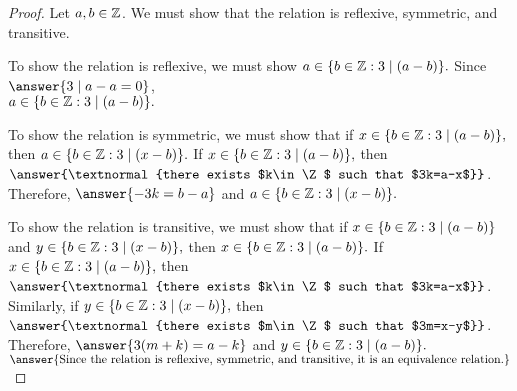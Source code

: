 \documentclass{ximera}
\begin{document}
  \begin{proof}
    Let $a,b\in\mathbb Z$. We must show that the relation is reflexive, symmetric, and transitive.
  
     To show the relation is reflexive, we must show $a\in \{b\in\mathbb Z: 3\mid(a-b)\}.$ Since $\answer{3\mid a-a=0}$,\\
     $a\in \{b\in\mathbb Z: 3\mid(a-b)\}.$
  
     To show the relation is symmetric, we must show that if $x\in \{b\in\mathbb Z: 3\mid(a-b)\},$ then $a\in \{b\in\mathbb Z: 3\mid(x-b)\}.$ If $x\in \{b\in\mathbb Z: 3\mid(a-b)\},$ then $\answer{\textnormal{there exists $k\in\Z$ such that $3k=a-x$}}$. Therefore, $\answer{-3k=b-a}$
     and $a\in \{b\in\mathbb Z: 3\mid(x-b)\}.$
  
     To show the relation is transitive, we must show that if $x\in \{b\in\mathbb Z: 3\mid(a-b)\}$ and $y\in \{b\in\mathbb Z: 3\mid(x-b)\},$ then $x\in \{b\in\mathbb Z: 3\mid(a-b)\}.$ If $x\in \{b\in\mathbb Z: 3\mid(a-b)\},$ then $\answer{\textnormal{there exists $k\in\Z$ such that $3k=a-x$}}$. 
     Similarly, if $y\in \{b\in\mathbb Z: 3\mid(x-b)\},$ then $\answer{\textnormal{there exists $m\in\Z$ such that $3m=x-y$}}$.
     Therefore, $\answer{3(m+k)=a-k}$
     and $y\in \{b\in\mathbb Z: 3\mid(a-b)\}.$ $\answer{\textnormal{Since the relation is reflexive, symmetric, and transitive, it is an equivalence relation.}}$
  \end{proof}

\end{document}
